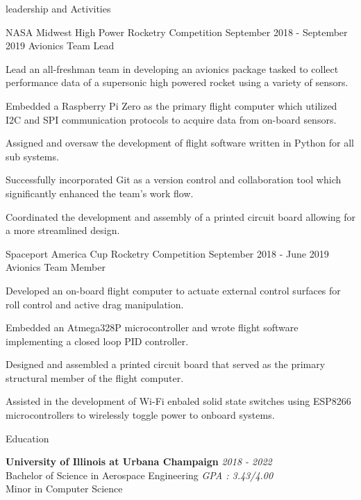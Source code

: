 \documentclass{resume} %
\begin{document}
\begin{rSection} {leadership and Activities}
\begin{rSubsection} {NASA Midwest High Power Rocketry Competition} {September 2018 - September 2019} {Avionics Team Lead}
            \item Lead an all-freshman team in developing an avionics package tasked to collect performance data of a supersonic high powered rocket using a variety of sensors.
            \item Embedded a Raspberry Pi Zero as the primary flight computer which utilized I2C and SPI communication protocols to acquire data from on-board sensors.
            \item Assigned and oversaw the development of flight software written in Python for all sub systems.
            \item Successfully incorporated Git as a version control and collaboration tool which significantly enhanced the team's work flow.
            \item Coordinated the development and assembly of a printed circuit board allowing for a more streamlined design.

        \end{rSubsection}


        \begin{rSubsection} {Spaceport America Cup Rocketry Competition} {September 2018 - June 2019} {Avionics Team Member}

            \item Developed an on-board flight computer to actuate external control surfaces for roll control and active drag manipulation.
            \item Embedded an Atmega328P microcontroller and wrote flight software implementing a closed loop PID controller.
            \item Designed and assembled a printed circuit board that served as the primary structural member of the flight computer.
            \item Assisted in the development of Wi-Fi enbaled solid state switches using ESP8266 microcontrollers to wirelessly toggle power to onboard systems.

        \end{rSubsection}

    \end{rSection}


    \begin{rSection}{Education}

        {\textbf{University of Illinois at Urbana Champaign}} \hfill {\em 2018 - 2022}\\
        Bachelor of Science in Aerospace Engineering \hfill {\em GPA : 3.43/4.00} \\
        Minor in Computer Science


    \end{rSection}
\end{document}
